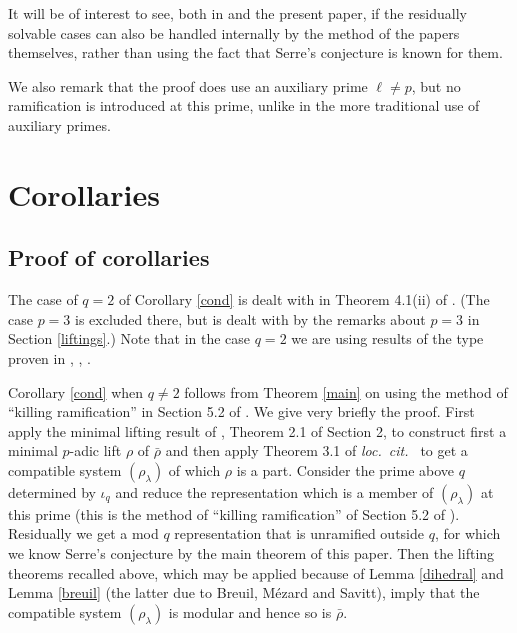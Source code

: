 \documentclass[12pt]{amsart}
\newcommand{\rhobar}{\overline{\rho}}
\def\rhobar{ {\bar {\rho} } }
\begin{document}
\vspace{3mm}

 It will be of interest to see, both in \cite{KW} and the present paper, if the residually solvable cases can also be handled internally by the method of the papers themselves, rather than using the fact that Serre's conjecture is known for them.
%

We also remark that the proof does use an auxiliary  prime $\ell \neq p$, but no ramification is introduced at this prime, unlike in the 
more traditional use of auxiliary primes. 

 
\section{Corollaries}\label{cors}

\subsection{Proof of corollaries}

The case of $q=2$ of Corollary \ref{cond} is dealt with in Theorem 4.1(ii) 
of \cite{KW}. (The case $p=3$ is excluded there, but is dealt with
by the remarks about $p=3$ in Section \ref{liftings}.) Note that in the case $q=2$ we are using results of the type proven in \cite{Fontaine}, \cite{BK}, \cite{Schoof1}.

Corollary \ref{cond} when $q \neq 2$ follows from Theorem \ref{main} on using the method of ``killing ramification'' in Section 5.2 of \cite{KW}. We give very briefly the proof.
First apply the minimal lifting result of \cite{KW}, Theorem 2.1 of Section 2,
to construct first a minimal $p$-adic lift $\rho$ of $\rhobar$ and then apply Theorem 3.1 of 
{\it loc.\ cit.\ } to get a compatible system $(\rho_\lambda)$
of which $\rho$ is a part.
Consider the prime above $q$ determined by $\iota_q$ and reduce the representation which is a member of $(\rho_\lambda)$ 
at this prime (this is the method of ``killing ramification'' of Section 5.2 of 
\cite{KW}). Residually we get a mod $q$ representation that is unramified outside $q$, for which we know Serre's conjecture by the main theorem of this paper. Then the lifting theorems recalled above, which may be applied because of  Lemma \ref{dihedral} and Lemma \ref{breuil} (the latter due to Breuil, M\'ezard and Savitt), imply that the compatible system $(\rho_\lambda)$ is modular and hence so is $\rhobar$.
\end{document}
